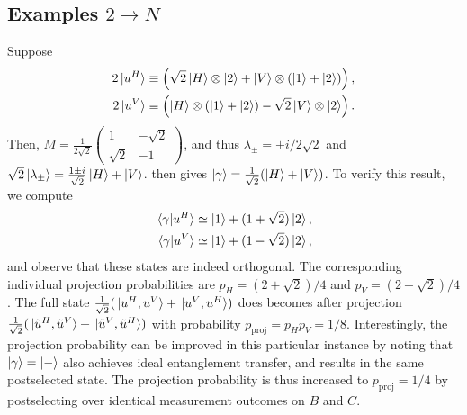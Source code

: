 \documentclass[
	aps, pra,
	superscriptaddress, twocolumn,
	floatfix,
	10pt
]{revtex4-1}
\newcommand{\on}[1]{\operatorname{#1}}
\newcommand{\parTitle}[1]{\noindent{\color{Mahogany}(\emph{#1})}}
\renewcommand{\parTitle}[1]{}
\begin{document}
\subsection{Examples \texorpdfstring{$2\to N$}{2->N}}
\parTitle{Example 1}
Suppose
\begin{equation}
\begin{aligned}
    2\ket*{u^H} \equiv \left(
        \sqrt2\ket H \otimes\ket2 +
        \ket V \otimes(\ket1 + \ket2)
    \right), \\
    2\ket*{u^V} \equiv \left(
        \ket H\otimes(\ket1 + \ket2) -
        \sqrt2\ket V\otimes \ket2
    \right).
\end{aligned}
\end{equation}
Then,
$M = \frac{1}{2\sqrt2}\begin{pmatrix}1 & -\sqrt2 \\ \sqrt2 & -1 \end{pmatrix}$,
and thus $\lambda_\pm=\pm i/2\sqrt2$ and
$\sqrt2\ket{\lambda_\pm}=\frac{1\pm i}{\sqrt2}\ket H + \ket V$.
 then gives
$\ket\gamma=\frac{1}{\sqrt2}(\ket H + \ket V)$.
To verify this result, we compute
\begin{equation}
\begin{aligned}
    \braket*{\gamma}{u^H} \simeq %
        \ket1 + (1+\sqrt2)\ket2, \\
    \braket*{\gamma}{u^V} \simeq %
        \ket1 + (1-\sqrt2)\ket2,
\end{aligned}
\end{equation}
and observe that these states are indeed orthogonal.
The corresponding individual projection probabilities are
$p_H=(2+\sqrt2)/4$ and $p_V=(2-\sqrt2)/4$.
The full state $\frac{1}{\sqrt2}(\ket*{u^H,u^V}+\ket*{u^V,u^H})$ does becomes after projection
$\frac{1}{\sqrt2}(\ket*{\tilde u^H,\tilde u^V}+\ket*{\tilde u^V,\tilde u^H})$
with probability $p_{\on{proj}} = p_H p_V = 1/8$.
Interestingly, the projection probability can be improved in this particular instance by noting that $\ket\gamma=\ket -$ also achieves ideal entanglement transfer, and results in the same postselected state. The projection probability is thus increased to $p_{\on{proj}}=1/4$ by postselecting over identical measurement outcomes on $B$ and $C$.
\end{document}
